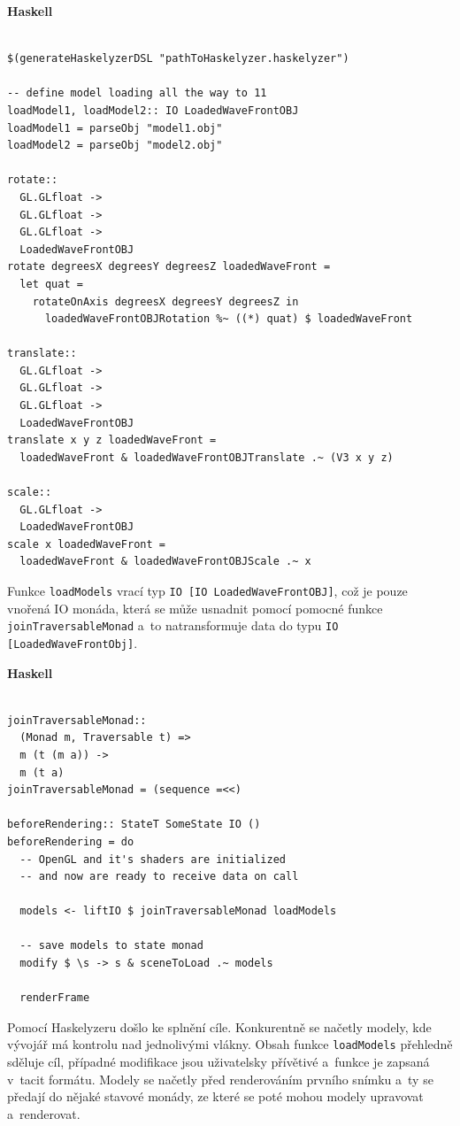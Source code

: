 \documentclass[male, czech]{kithesis}
\newcommand{\haskellInline}[1]{\colorbox{gray!10}{\texttt{#1}}}
\begin{document}
\textbf{Haskell}
\begin{verbatim}

$(generateHaskelyzerDSL "pathToHaskelyzer.haskelyzer")

-- define model loading all the way to 11
loadModel1, loadModel2:: IO LoadedWaveFrontOBJ
loadModel1 = parseObj "model1.obj"
loadModel2 = parseObj "model2.obj"

rotate:: 
  GL.GLfloat -> 
  GL.GLfloat -> 
  GL.GLfloat -> 
  LoadedWaveFrontOBJ
rotate degreesX degreesY degreesZ loadedWaveFront = 
  let quat = 
    rotateOnAxis degreesX degreesY degreesZ in 
      loadedWaveFrontOBJRotation %~ ((*) quat) $ loadedWaveFront 

translate:: 
  GL.GLfloat -> 
  GL.GLfloat -> 
  GL.GLfloat -> 
  LoadedWaveFrontOBJ
translate x y z loadedWaveFront = 
  loadedWaveFront & loadedWaveFrontOBJTranslate .~ (V3 x y z)
      
scale:: 
  GL.GLfloat -> 
  LoadedWaveFrontOBJ
scale x loadedWaveFront = 
  loadedWaveFront & loadedWaveFrontOBJScale .~ x

\end{verbatim}

Funkce \haskellInline{loadModels} vrací typ \haskellInline{IO [IO LoadedWaveFrontOBJ]},
což je pouze vnořená IO monáda, 
která se může usnadnit pomocí pomocné funkce \haskellInline{joinTraversableMonad}
a~to natransformuje data do typu \haskellInline{IO [LoadedWaveFrontObj]}.

\textbf{Haskell}
\begin{verbatim}

joinTraversableMonad:: 
  (Monad m, Traversable t) => 
  m (t (m a)) -> 
  m (t a)
joinTraversableMonad = (sequence =<<)

beforeRendering:: StateT SomeState IO ()
beforeRendering = do
  -- OpenGL and it's shaders are initialized 
  -- and now are ready to receive data on call

  models <- liftIO $ joinTraversableMonad loadModels 

  -- save models to state monad
  modify $ \s -> s & sceneToLoad .~ models

  renderFrame

\end{verbatim}

Pomocí Haskelyzeru došlo ke splnění cíle.
Konkurentně se načetly modely, 
kde vývojář má kontrolu nad jednolivými vlákny.
Obsah funkce \haskellInline{loadModels} přehledně sděluje cíl,  
případné modifikace jsou uživatelsky přívětivé
a~funkce je zapsaná v~tacit formátu.
Modely se načetly před renderováním prvního snímku
a~ty se předají do nějaké stavové monády, 
ze které se poté mohou modely upravovat a~renderovat.
\end{document}
